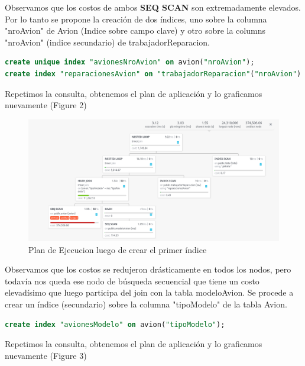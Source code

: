 \documentclass[12pt]{report}
\begin{document}
Observamos que los costos de ambos \textbf{SEQ SCAN} son extremadamente elevados. Por lo tanto se propone la creación de dos índices, uno sobre la columna "nroAvion" de Avion (Indice sobre campo clave) y otro sobre la columns "nroAvion" (indice secundario) de trabajadorReparacion.

\begin{lstlisting}[language=SQL]
create unique index "avionesNroAvion" on avion("nroAvion");
create index "reparacionesAvion" on "trabajadorReparacion"("nroAvion")
\end{lstlisting}

Repetimos la consulta, obtenemos el plan de aplicación y lo graficamos nuevamente (Figure 2)

\begin{figure}[!ht]
    \centering
    \includegraphics[width=1\textwidth]{images/plan_ejecucion_index_1.png}
    \caption{Plan de Ejecucion luego de crear el primer índice}
    \centering
    \label{label:file_name}
\end{figure}

Observamos que los costos se redujeron drásticamente en todos los nodos, pero todavía nos queda ese nodo de búsqueda secuencial que tiene un costo elevadísimo que luego participa del join con la tabla modeloAvion. Se procede a crear un índice (secundario) sobre la columna "tipoModelo" de la tabla Avion.

\begin{lstlisting}[language=SQL]
create index "avionesModelo" on avion("tipoModelo");
\end{lstlisting}

Repetimos la consulta, obtenemos el plan de aplicación y lo graficamos nuevamente (Figure 3)
\end{document}
